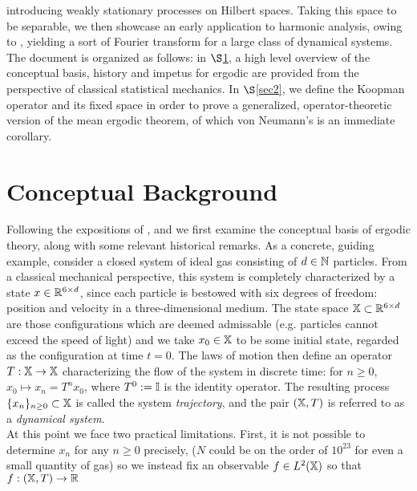 \documentclass[11pt]{report}
\newcommand{\1}[1]{\mathbbm{1}_{\{#1\}}}
\theoremstyle{definition}
\begin{document}
    introducing weakly stationary processes on Hilbert spaces. Taking this
    space to be separable, we then showcase an early application to harmonic
    analysis, owing to \cite{Fan_1946}, yielding a sort of Fourier transform for
    a large class of dynamical systems.\\[5pt]
    \indent The document is organized as follows: in $\S$\ref{sec1},
    a high level overview of the conceptual basis, history and impetus for ergodic
    are provided from the perspective of classical statistical mechanics. In $\S$\ref{sec2},
    we define the Koopman operator and its fixed space in order to prove a generalized, operator-theoretic
    version of the mean ergodic theorem, of which von Neumann's is an immediate corollary.

    \section{Conceptual Background}\label{sec1}
    Following the expositions of \cite[ch.1]{Eisner_Farkas_Haase_Nagel_2015},
    and \cite[ch.2, $\S$5]{Reed_Simon_1972} we first examine the conceptual
    basis of ergodic theory, along with some relevant historical remarks. As a
    concrete, guiding example, consider a closed system of ideal gas consisting
    of $d\in\mathbb{N}$ particles. From a classical mechanical perspective, this
    system is completely characterized by a state $x\in\mathbb{R}^{6\times d}$,
    since each particle is bestowed with six degrees of freedom: position and
    velocity in a three-dimensional medium. The state space
    $\mathbb{X}\subset\mathbb{R}^{6\times d}$ are those configurations which are
    deemed admissable (e.g. particles cannot exceed the speed of light) and we
    take $x_0\in\mathbb{X}$ to be some initial state, regarded as the configuration
    at time $t=0$. The laws of motion then define an operator
    $T:\mathbb{X}\rightarrow\mathbb{X}$ characterizing the flow of the system in
    discrete time: for $n\geq 0$, $x_0\mapsto x_n=T^nx_0$, where $T^0:=\mathbb{I}$
    is the identity operator. The resulting process
    $\{x_n\}_{n\geq0}\subset\mathbb{X}$ is called the system \textit{trajectory},
    and the pair $(\mathbb{X},T)$ is referred to as a \textit{dynamical
    system}.\\[5pt]
    \indent At this point we face two practical limitations. First, it is not
    possible to determine $x_n$ for any $n\geq 0$ precisely, ($N$ could be on
    the order of $10^{23}$ for even a small quantity of gas) so we instead fix
    an observable $f\in L^2(\mathbb{X})$ so that $f:(\mathbb{X},T)\rightarrow\mathbb{R}$
\end{document}
